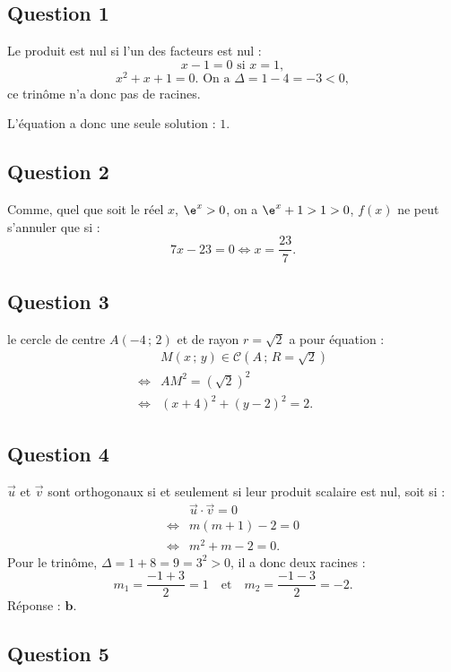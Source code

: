 \subsection*{Question 1}

Le produit est nul si l'un des facteurs est nul :
\[
x - 1 = 0 \text{ si } x = 1,
\]
\[
x^2 + x + 1 = 0. \text{ On a } \Delta = 1 - 4 = -3 < 0,
\]
ce trinôme n'a donc pas de racines.

L'équation a donc une seule solution : \(1\).

\subsection*{Question 2}

Comme, quel que soit le réel \(x\), \(\e^x > 0\), on a \(\e^x + 1 > 1 > 0\), \(f(x)\) ne peut s'annuler que si : \[
7x - 23 = 0 \iff x = \dfrac{23}{7}.
\]

\subsection*{Question 3}

le cercle de centre \(A(-4\,;\,2)\) et de rayon \(r = \sqrt{2}\) a pour équation :
\begin{align*}
&M(x\,;\,y) \in \mathcal{C}(A\,;\,R = \sqrt{2}) \\
\iff &AM^2 = (\sqrt{2})^2 \\
\iff &(x + 4)^2 + (y - 2)^2 = 2.
\end{align*}

\subsection*{Question 4}
 
\(\vec{u}\) et \(\vec{v}\) sont orthogonaux si et seulement si leur produit scalaire est nul, soit si :
\begin{align*}
&\vec{u} \cdot \vec{v} = 0 \\
\iff &m(m + 1) - 2 = 0 \\
\iff &m^2 + m - 2 = 0.
\end{align*}
Pour le trinôme, \(\Delta = 1 + 8 = 9 = 3^2 > 0\), il a donc deux racines :
\[
m_1 = \dfrac{-1 + 3}{2} = 1 \quad \text{et} \quad m_2 = \dfrac{-1 - 3}{2} = -2.
\]
Réponse : \(\textbf{b.}\)

\subsection*{Question 5}

